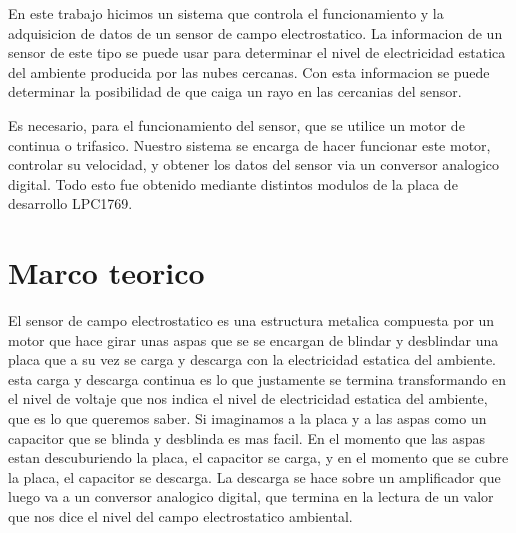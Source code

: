 \documentclass[a4paper]{article}
\begin{document}

En este trabajo hicimos un sistema que controla el funcionamiento y la adquisicion de datos de un sensor de campo electrostatico. La informacion de un sensor de este tipo se puede usar para determinar el nivel de electricidad estatica del ambiente producida por las nubes cercanas. Con esta informacion se puede determinar la posibilidad de que caiga un rayo en las cercanias del sensor.

Es necesario, para el funcionamiento del sensor, que se utilice un motor de continua o trifasico. Nuestro sistema se encarga de hacer funcionar este motor, controlar su velocidad, y obtener los datos del sensor via un conversor analogico digital. Todo esto fue obtenido mediante distintos modulos de la placa de desarrollo LPC1769. 


\section{Marco teorico} %
\label{sec:marco_teorico}





El sensor de campo electrostatico es una estructura metalica compuesta por un motor que hace girar unas aspas que se se encargan de blindar y desblindar una placa que a su vez se carga y descarga con la electricidad estatica del ambiente. esta carga y descarga continua es lo que justamente se termina transformando en el nivel de voltaje que nos indica el nivel de electricidad estatica del ambiente, que es lo que queremos saber. Si imaginamos a la placa y a las aspas como un capacitor que se blinda y desblinda es mas facil. En el momento que las aspas estan descuburiendo la placa, el capacitor se carga, y en el momento que se cubre la placa, el capacitor se descarga. La descarga se hace sobre un amplificador que luego va a un conversor analogico digital, que termina en la lectura de un valor que nos dice el nivel del campo electrostatico ambiental.
\end{document}
